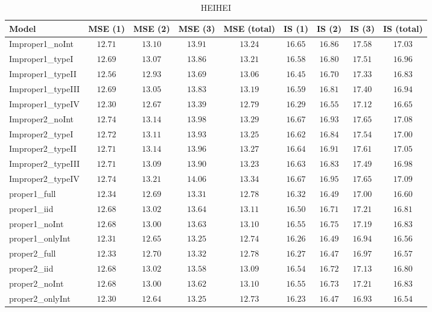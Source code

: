 \begin{table}

\caption{\label{tab:model-choice-sc10}HEIHEI}
\centering
\begin{tabular}{lcccccccc}
\hline
Model  & MSE (1) & MSE (2) & MSE (3) & MSE (total) & IS (1) & IS (2) & IS (3) & \multicolumn{1}{c}{IS (total)} \\ 
\hline
Improper1_noInt  & $12.71$ & $13.10$ & $13.91$ & $13.24$ & $16.65$ & $16.86$ & $17.58$ & $17.03$ \\
Improper1_typeI  & $12.69$ & $13.07$ & $13.86$ & $13.21$ & $16.58$ & $16.80$ & $17.51$ & $16.96$ \\
Improper1_typeII  & $12.56$ & $12.93$ & $13.69$ & $13.06$ & $16.45$ & $16.70$ & $17.33$ & $16.83$ \\
Improper1_typeIII  & $12.69$ & $13.05$ & $13.83$ & $13.19$ & $16.59$ & $16.81$ & $17.40$ & $16.94$ \\
Improper1_typeIV  & $12.30$ & $12.67$ & $13.39$ & $12.79$ & $16.29$ & $16.55$ & $17.12$ & $16.65$ \\
Improper2_noInt  & $12.74$ & $13.14$ & $13.98$ & $13.29$ & $16.67$ & $16.93$ & $17.65$ & $17.08$ \\
Improper2_typeI  & $12.72$ & $13.11$ & $13.93$ & $13.25$ & $16.62$ & $16.84$ & $17.54$ & $17.00$ \\
Improper2_typeII  & $12.71$ & $13.14$ & $13.96$ & $13.27$ & $16.64$ & $16.91$ & $17.61$ & $17.05$ \\
Improper2_typeIII  & $12.71$ & $13.09$ & $13.90$ & $13.23$ & $16.63$ & $16.83$ & $17.49$ & $16.98$ \\
Improper2_typeIV  & $12.74$ & $13.21$ & $14.06$ & $13.34$ & $16.67$ & $16.95$ & $17.65$ & $17.09$ \\
proper1_full  & $12.34$ & $12.69$ & $13.31$ & $12.78$ & $16.32$ & $16.49$ & $17.00$ & $16.60$ \\
proper1_iid  & $12.68$ & $13.02$ & $13.64$ & $13.11$ & $16.50$ & $16.71$ & $17.21$ & $16.81$ \\
proper1_noInt  & $12.68$ & $13.00$ & $13.63$ & $13.10$ & $16.55$ & $16.75$ & $17.19$ & $16.83$ \\
proper1_onlyInt  & $12.31$ & $12.65$ & $13.25$ & $12.74$ & $16.26$ & $16.49$ & $16.94$ & $16.56$ \\
proper2_full  & $12.33$ & $12.70$ & $13.32$ & $12.78$ & $16.27$ & $16.47$ & $16.97$ & $16.57$ \\
proper2_iid  & $12.68$ & $13.02$ & $13.58$ & $13.09$ & $16.54$ & $16.72$ & $17.13$ & $16.80$ \\
proper2_noInt  & $12.68$ & $13.00$ & $13.62$ & $13.10$ & $16.55$ & $16.73$ & $17.21$ & $16.83$ \\
proper2_onlyInt  & $12.30$ & $12.64$ & $13.25$ & $12.73$ & $16.23$ & $16.47$ & $16.93$ & $16.54$ \\
\hline 
\end{tabular}


\end{table}